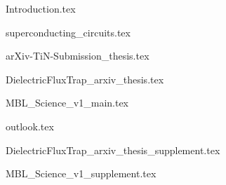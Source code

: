 





\maketitle
\begin{frontmatter}

%




%

%


\cleardoublepage
{}
\begin{singlespace}
\tableofcontents
\end{singlespace}

\end{frontmatter}

\pagestyle{plain} %

%
{Introduction.tex}

{superconducting_circuits.tex}

{arXiv-TiN-Submission_thesis.tex}

{DielectricFluxTrap_arxiv_thesis.tex}

{MBL_Science_v1_main.tex}

{outlook.tex}

\begin{appendices}
{DielectricFluxTrap_arxiv_thesis_supplement.tex}

\inprogress{
}


{MBL_Science_v1_supplement.tex}

\end{appendices}




%
%
\printbibliography


